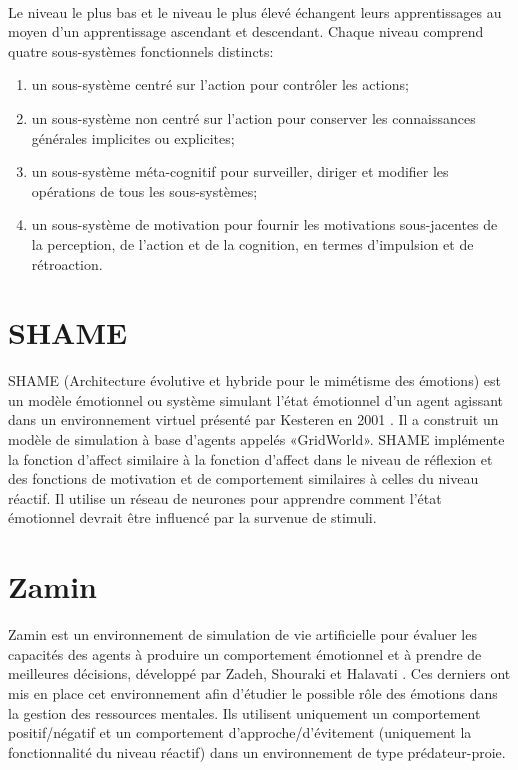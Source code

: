 ~\par
Le niveau le plus bas et le niveau le plus élevé échangent leurs apprentissages au moyen d'un apprentissage ascendant et descendant. Chaque niveau comprend quatre sous-systèmes fonctionnels distincts:

\begin{enumerate}
\item un sous-système centré sur l'action pour contrôler les actions;
\item un sous-système non centré sur l'action pour conserver les connaissances générales implicites ou explicites;
\item un sous-système méta-cognitif pour surveiller, diriger et modifier les opérations de tous les sous-systèmes;
\item un sous-système de motivation pour fournir les motivations sous-jacentes de la perception, de l'action et de la cognition, en termes d'impulsion et de rétroaction.
\end{enumerate}

\section{SHAME}

SHAME (Architecture évolutive et hybride pour le mimétisme des émotions) est un modèle émotionnel ou système simulant l'état émotionnel d'un agent agissant dans un environnement virtuel présenté par Kesteren en 2001 \parencite{kesteren2001supervised}. Il a construit un modèle de simulation à base d'agents appelés «GridWorld». SHAME implémente la fonction d’affect similaire à la fonction d’affect dans le niveau de réflexion et des fonctions de motivation et de comportement similaires à celles du niveau réactif. Il utilise un réseau de neurones pour apprendre comment l'état émotionnel devrait être influencé par la survenue de stimuli.


\section{Zamin}

Zamin est un environnement de simulation de vie artificielle pour évaluer les capacités des agents à produire un comportement émotionnel et à prendre de meilleures décisions, développé par Zadeh, Shouraki et Halavati \parencite{zadeh2006emotional}. Ces derniers ont mis en place cet environnement afin d’étudier le possible rôle des émotions dans la gestion des ressources mentales. Ils utilisent uniquement un comportement positif/négatif et un comportement d'approche/d'évitement (uniquement la fonctionnalité du niveau réactif) dans un environnement de type prédateur-proie.
